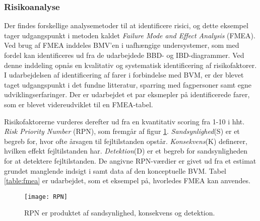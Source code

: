 	\subsubsection{Risikoanalyse}
	Der findes forskellige analysemetoder til at identificere risici, og dette eksempel tager udgangspunkt i metoden kaldet \textit{Failure Mode and Effect Analysis}{} (FMEA). Ved brug af FMEA inddeles BMV'en i uafhængige undersystemer, som med fordel kan identificeres ud fra de udarbejdede BBD- og IBD-diagrammer. Ved denne inddeling opnås en kvalitativ og systematisk identificering af risikofaktorer.
	I udarbejdelsen af identificering af farer i forbindelse med BVM, er der blevet taget udgangspunkt i det fundne litteratur, sparring med fagpersoner samt egne udviklingserfaringer. Der er udarbejdet et par eksmepler på identificerede farer, som er blevet videreudviklet til en FMEA-tabel.  
	
	Risikofaktorerne vurderes derefter ud fra en kvantitativ scoring fra 1-10 i hht. \textit{Risk Priority Number}{} (RPN), som fremgår af figur \ref{fig:rpn}. \textit{Sandsynlighed}{}(S) er et begreb for, hvor ofte årsagen til fejltilstanden opstår. \textit{Konsekvens}{}(K) definerer, hvilken effekt fejltilstanden har. \textit{Detektion}{}(D) er et begreb for sandsynligheden for at detektere fejltilstanden. De angivne RPN-værdier er givet ud fra et estimat grundet manglende indsigt i samt data af den konceptuelle BVM. Tabel \ref{table:fmea} er udarbejdet, som et eksempel på, hvorledes FMEA kan anvendes. 	
	 
	\begin{figure}[htb]
	\centering
	\texttt{[image: RPN]}
	\caption	{RPN er produktet af sandsynlighed, konsekvens og detektion.}
	\label{fig:rpn}
	\end{figure}


